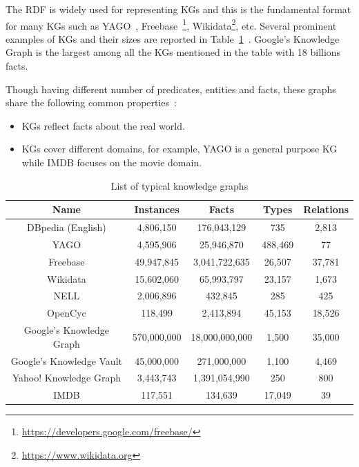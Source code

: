 The RDF is widely used for representing KGs and this is the fundamental format for many KGs such as YAGO~\cite{ref28}, Freebase~\footnote{\url{https://developers.google.com/freebase/}}, Wikidata\footnote{\url{https://www.wikidata.org}}, etc. Several prominent examples of KGs and their sizes are reported in Table~\ref{table1}~\cite{ref27}. Google's Knowledge Graph is the largest among all the KGs mentioned in the table with 18 billions facts.

Though having different number of predicates, entities and facts, these graphs share the following common properties~\cite{ref27}:

\begin{itemize}
\item KGs reflect facts about the real world.
\item KGs cover different domains, for example, YAGO is a general purpose KG while IMDB focuses on the movie domain.
\end{itemize}

\begin{table}
\begin{center}
\begin{tabular}{|c|c|c|c|c|}
\hline
Name & Instances & Facts & Types & Relations\\
\hline\hline
DBpedia (English) & 4,806,150 & 176,043,129 & 735 & 2,813\\
\hline
YAGO & 4,595,906 & 25,946,870 & 488,469 & 77\\
\hline
Freebase & 49,947,845 & 3,041,722,635 & 26,507 & 37,781\\
\hline
Wikidata & 15,602,060 & 65,993,797 & 23,157 & 1,673\\
\hline
NELL & 2,006,896 & 432,845 & 285 & 425\\
\hline
OpenCyc & 118,499 & 2,413,894 & 45,153 & 18,526\\
\hline
Google's Knowledge Graph & 570,000,000 & 18,000,000,000 & 1,500 & 35,000\\
\hline
Google's Knowledge Vault & 45,000,000 & 271,000,000 & 1,100 & 4,469\\
\hline
Yahoo! Knowledge Graph & 3,443,743 & 1,391,054,990 & 250 & 800\\
\hline
IMDB & 117,551 & 134,639 & 17,049 & 39 \\
\hline
\end{tabular}
\end{center}
\caption{List of typical knowledge graphs}
\label{table1}
\end{table}

